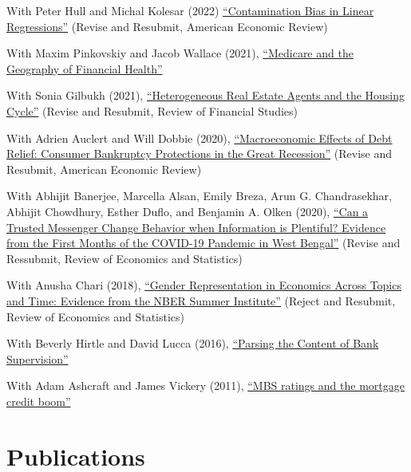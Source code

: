 \documentclass[letterpaper]{article}
\renewenvironment{itemize}{
  \begin{list}{}
    { \setlength{\itemsep}{5pt}
      \setlength{\parsep}{0pt}
      \setlength{\topsep}{0pt}
      \setlength{\leftmargin}{0em} } }{
  \end{list}}
\begin{document}
\begin{itemize}
\item With Peter Hull and Michal Kolesar (2022) \href{https://arxiv.org/abs/2106.05024}{``Contamination Bias in Linear Regressions''} (Revise and Resubmit, American Economic Review)
\item With Maxim Pinkovskiy and Jacob Wallace (2021), \href{http://paulgp.github.io/papers/GPW_compressed.pdf}{``Medicare and the Geography of Financial Health''}
\item With Sonia Gilbukh (2021), \href{http://paulgp.github.io/papers/Heterogeneous_Real_Estate_Agents_and_the_Housing_Cycle.pdf}{``Heterogeneous Real Estate Agents and the Housing Cycle''} (Revise and Resubmit, Review of Financial Studies)
\item With Adrien Auclert and Will Dobbie (2020), \href{http://paulgp.github.io/papers/Macroeconomic_Effects_of_Debt_Relief_Posting_342019.pdf}{``Macroeconomic Effects of Debt Relief: Consumer Bankruptcy Protections in the Great Recession''} (Revise and Resubmit, American Economic Review)
\item With  Abhijit Banerjee, Marcella Alsan, Emily Breza, Arun G. Chandrasekhar, Abhijit Chowdhury, Esther Duflo, and Benjamin A. Olken (2020), \href{https://economics.mit.edu/sites/default/files/2022-08/wb_manuscript_final.pdf}{``Can a Trusted Messenger Change Behavior when Information is Plentiful? Evidence from the First Months of the COVID-19 Pandemic in West Bengal''}  (Revise and Ressubmit, Review of Economics and Statistics)
\item With Anusha Chari (2018), \href{http://paulgp.github.io/papers/cgp_nbergender.pdf}{``Gender Representation in Economics Across Topics and Time: Evidence from the NBER Summer Institute''} (Reject and Resubmit, Review of Economics and Statistics)
\item With Beverly Hirtle and David Lucca (2016), \href{https://www.newyorkfed.org/research/staff_reports/sr770.html}{``Parsing the Content of Bank Supervision''}
\item With Adam Ashcraft and James Vickery (2011), \href{http://papers.ssrn.com/sol3/papers.cfm?abstract_id=1615613}{``MBS ratings and the mortgage credit boom''}
\end{itemize}

\section*{Publications}
\end{document}
